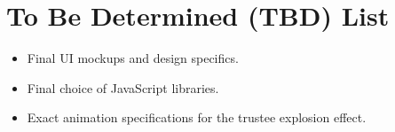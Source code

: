 \documentclass{scrreprt}
\begin{document}

\chapter{To Be Determined (TBD) List}
\begin{itemize}
    \item Final UI mockups and design specifics.
    \item Final choice of JavaScript libraries.
    \item Exact animation specifications for the trustee explosion effect.
\end{itemize}
\end{document}
